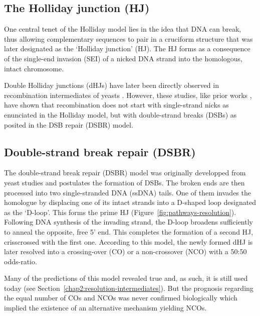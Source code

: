 \subsection{The Holliday junction (HJ)}

One central tenet of the Holliday model lies in the idea that DNA can break, thus allowing complementary sequences to pair in a cruciform structure that was later designated as the ‘Holliday junction’ (HJ).
The HJ forms as a consequence of the single-end invasion (SEI) of a nicked DNA strand into the homologous, intact chromosome.

Double Holliday junctions (dHJs) have later been directly observed in recombination intermediates of yeasts \citep{schwacha1994identification, schwacha1995identification}.
However, these studies, like prior works \citep{sun1989double,cao1990pathway}, have shown that recombination does not start with single-strand nicks as enunciated in the Holliday model, but with double-strand breaks (DSBs) as posited in the DSB repair (DSBR) model.


\subsection{Double-strand break repair (DSBR)}

The double-strand break repair (DSBR) model \citep{szostak1983doublestrandbreak} was originally developped from yeast studies \citep{orr-weaver1981yeast, orr-weaver1983yeast} and postulates the formation of DSBs. 
The broken ends are then processed into two single-stranded DNA (ssDNA) tails. 
One of them invades the homologue by displacing one of its intact strands into a D-shaped loop designated as the ‘D-loop’. This forms the prime HJ (Figure~\ref{fig:pathways-resolution}).
Following DNA synthesis of the invading strand, the D-loop broadens sufficiently to anneal the opposite, free 5’ end.
This completes the formation of a second HJ, crisscrossed with the first one.
According to this model, the newly formed dHJ is later resolved into a crossing-over (CO) or a non-crossover (NCO) with a 50:50 odds-ratio.

Many of the predictions of this model revealed true and, as such, it is still used today (see Section~\ref{chap2:resolution-intermediates}).
But the prognosis regarding the equal number of COs and NCOs was never confirmed biologically \citep{bishop2004early} which implied the existence of an alternative mechanism yielding NCOs.





